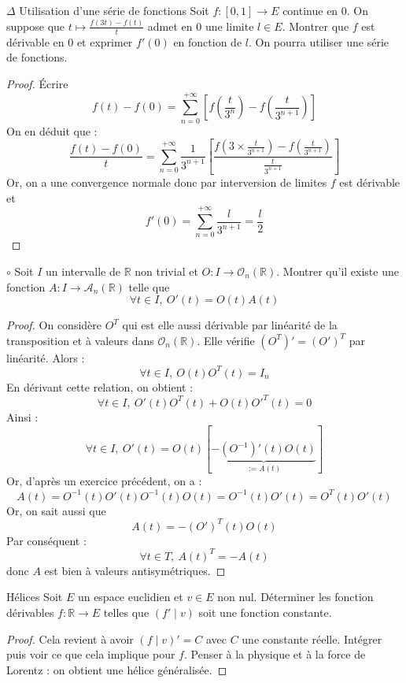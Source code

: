 \documentclass[french,a4paper]{article}
\newcommand{\R}{\mathbb{R}}
\newcommand{\inv}{^{-1}}
\theoremstyle{plain}
\theoremstyle{definition}
\theoremstyle{remark}
\begin{document}
\begin{ex}[Moulin.FV.09]{$\Delta$ Utilisation d'une série de fonctions}
	Soit $f:[0,1]\to E$ continue en $0$. On suppose que $t\mapsto\displaystyle\frac{f(3t)-f(t)}{t}$ admet en $0$ une limite $l\in E$. Montrer que $f$ est dérivable en $0$ et exprimer $f'(0)$ en fonction de $l$. On pourra utiliser une série de fonctions.
\end{ex}
\begin{proof}
	Écrire $$f(t)-f(0)=\sum_{n=0}^{+\infty}\left[f\left(\frac{t}{3^{n}}\right)-f\left(\frac{t}{3^{n+1}}\right)\right]$$ On en déduit que : $$\frac{f(t)-f(0)}{t}=\sum_{n=0}^{+\infty}\frac{1}{3^{n+1}}\left[\frac{\displaystyle f\left(3\times\frac{t}{3^{n+1}}\right)-f\left(\frac{t}{3^{n+1}}\right)}{\displaystyle\frac{t}{3^{n+1}}}\right]$$ Or, on a une convergence normale donc par interversion de limites $f$ est dérivable et $$f'(0)=\sum_{n=0}^{+\infty}\frac{l}{3^{n+1}}=\frac{l}{2}$$
\end{proof}

\begin{ex}[Moulin.FV.10]{$\circ$}
	Soit $I$ un intervalle de $\R$ non trivial et $O:I\to\mathcal{O}_n(\R)$. Montrer qu'il existe une fonction $A:I\to\mathcal{A}_n(\R)$ telle que $$\forall t\in I,\ O'(t)=O(t)A(t)$$
\end{ex}
\begin{proof}
	On considère $O^T$ qui est elle aussi dérivable par linéarité de la transposition et à valeurs dans $\mathcal{O}_n(\R)$. Elle vérifie $(O^T)'=(O')^T$ par linéarité. Alors : $$\forall t\in I,\ O(t)O^T(t)=I_n$$ En dérivant cette relation, on obtient : $$\forall t\in I,\ O'(t)O^T(t)+O(t)O'^T(t)=0$$ Ainsi : $$\forall t\in I,\ O'(t)=O(t)\left[\underbrace{-(O\inv)'(t)O(t)}_{:=A(t)}\right]$$ Or, d'après un exercice précédent, on a : $$A(t)=O\inv(t)O'(t)O\inv(t)O(t)=O\inv(t)O'(t)=O^T(t)O'(t)$$ Or, on sait aussi que $$A(t)=-(O')^T(t)O(t)$$ Par conséquent : $$\forall t\in T,\ A(t)^T=-A(t)$$ donc $A$ est bien à valeurs antisymétriques.
\end{proof}

\begin{ex}[Moulin.FV.11]{Hélices}
	Soit $E$ un espace euclidien et $v\in E$ non nul. Déterminer les fonction dérivables $f:\R\to E$ telles que $(f'\mid v)$ soit une fonction constante.
\end{ex}
\begin{proof}
	Cela revient à avoir $(f\mid v)'=C$ avec $C$ une constante réelle. Intégrer puis voir ce que cela implique pour $f$. Penser à la physique et à la force de Lorentz : on obtient une hélice généralisée.
\end{proof}
\end{document}
